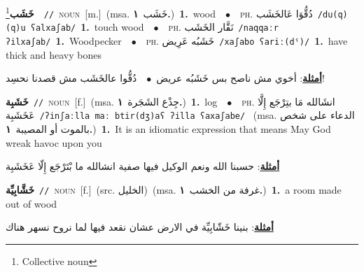 \documentclass[10pt,a4paper,twoside]{article} %
\begin{document}
\begin{multicols}{2}
{\setlength\topsep{0pt}\textbf{\foreignlanguage{arabic}{خَشَب}}\footnote{Collective noun}\ \ {\color{gray}\texttt{//}\color{black}}\ \textsc{noun}\ [m.]\ \color{gray}(msa. \foreignlanguage{arabic}{خَشَب}~\foreignlanguage{arabic}{\textbf{١.}})\color{black}\ \textbf{1.}~wood\ \ $\bullet$\ \ \textsc{ph.} \color{gray} \foreignlanguage{arabic}{دُقُّوَا عَالخَشَب}\color{black}\ {\color{gray}\texttt{/{\sffamily du(q)(q)u ʕalxaʃab}/}\color{black}}\ \textbf{1.}~touch wood\ \ $\bullet$\ \ \textsc{ph.} \color{gray} \foreignlanguage{arabic}{نَقَّار الخَشَب}\color{black}\ {\color{gray}\texttt{/{\sffamily naqqaːr ʔilxaʃab}/}\color{black}}\ \textbf{1.}~Woodpecker\ \ $\bullet$\ \ \textsc{ph.} \color{gray} \foreignlanguage{arabic}{خَشَبُه عَرِيض}\color{black}\ {\color{gray}\texttt{/{\sffamily xaʃabo ʕariː(dˤ)}/}\color{black}}\ \textbf{1.}~have thick and heavy bones\  \begin{flushright}\color{gray}\foreignlanguage{arabic}{\textbf{\underline{\foreignlanguage{arabic}{أمثلة}}}: أخوي مش ناصح بس خَشَبُه عريض\ $\bullet$\ \  دُقُّوا عالخَشَب مش قصدنا نحسِد!}\end{flushright}\color{black}} \vspace{2mm}

{\setlength\topsep{0pt}\textbf{\foreignlanguage{arabic}{خَشَبِة}}\ {\color{gray}\texttt{//}\color{black}}\ \textsc{noun}\ [f.]\ \color{gray}(msa. \foreignlanguage{arabic}{جِذْع الشَجَرة}~\foreignlanguage{arabic}{\textbf{١.}})\color{black}\ \textbf{1.}~log\ \ $\bullet$\ \ \textsc{ph.} \color{gray} \foreignlanguage{arabic}{انشَالله مَا بتِرْجَع إِلَّا عَخَشَبِة}\color{black}\ {\color{gray}\texttt{/{\sffamily ʔinʃaːlla maː btir(dʒ)aʕ ʔilla ʕaxaʃabe}/}\color{black}}\ \color{gray} (msa. \foreignlanguage{arabic}{الدعاء على شخص بالموت أو المصيبة}~\foreignlanguage{arabic}{\textbf{١.}})\color{black}\ \textbf{1.}~It is an idiomatic expression that means May God wreak havoc upon you\  \begin{flushright}\color{gray}\foreignlanguage{arabic}{\textbf{\underline{\foreignlanguage{arabic}{أمثلة}}}: حسبنا الله ونعم الوكيل فيها صفية انشالله ما بْتَرْجَع إِلّا عَخَشَبِة}\end{flushright}\color{black}} \vspace{2mm}

{\setlength\topsep{0pt}\textbf{\foreignlanguage{arabic}{خَشَّابِيِّة}}\ {\color{gray}\texttt{//}\color{black}}\ \textsc{noun}\ [f.]\ (src. \color{gray}\foreignlanguage{arabic}{الخليل}\color{black})\ \color{gray}(msa. \foreignlanguage{arabic}{غرفة من الخشب}~\foreignlanguage{arabic}{\textbf{١.}})\color{black}\ \textbf{1.}~a room made out of wood\  \begin{flushright}\color{gray}\foreignlanguage{arabic}{\textbf{\underline{\foreignlanguage{arabic}{أمثلة}}}: بنينا خَشّابِيِّة في الارض عشان نقعد فيها لما نروح نسهر هناك}\end{flushright}\color{black}} \vspace{2mm}


\end{multicols}
\end{document}
